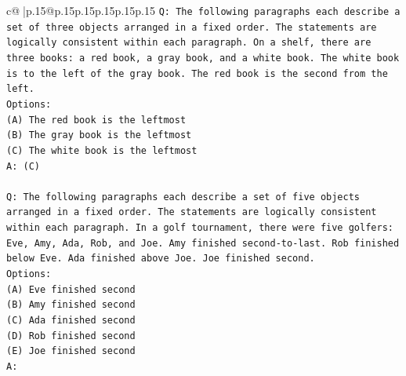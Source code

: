 \documentclass{article}
\begin{document}
{\begin{supertabular}{c@{$\;$}|p{.15\linewidth}@{}p{.15\linewidth}p{.15\linewidth}p{.15\linewidth}p{.15\linewidth}p{.15\linewidth}}
{{{\texttt{Q: The following paragraphs each describe a set of three objects arranged in a fixed order. The statements are logically consistent within each paragraph. On a shelf, there are three books: a red book, a gray book, and a white book. The white book is to the left of the gray book. The red book is the second from the left.} \\
\texttt{Options:} \\
\texttt{(A) The red book is the leftmost} \\
\texttt{(B) The gray book is the leftmost} \\
\texttt{(C) The white book is the leftmost} \\
\texttt{A: (C)} \\
\\ 
\texttt{Q: The following paragraphs each describe a set of five objects arranged in a fixed order. The statements are logically consistent within each paragraph. In a golf tournament, there were five golfers: Eve, Amy, Ada, Rob, and Joe. Amy finished second{-}to{-}last. Rob finished below Eve. Ada finished above Joe. Joe finished second.} \\
\texttt{Options:} \\
\texttt{(A) Eve finished second} \\
\texttt{(B) Amy finished second} \\
\texttt{(C) Ada finished second} \\
\texttt{(D) Rob finished second} \\
\texttt{(E) Joe finished second} \\
\texttt{A:} \\
            }
        }
    }
     \\ \\


\end{supertabular}}
\end{document}
